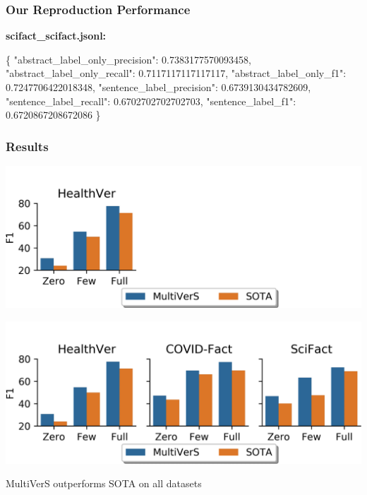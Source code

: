 \documentclass[13.5pt,aspecratio=169, xcolor=dvipsnames]{beamer}
\begin{document}
\begin{frame}[fragile]
    \onehalfspacing
        \frametitle{Our Reproduction Performance}
        \textbf{scifact\_scifact.jsonl:}
\vspace*{-1em} 
\begin{mybox}
\begin{semiverbatim}
\{
    "abstract_label_only_precision": 0.7383177570093458,
    "abstract_label_only_recall": 0.7117117117117117,
    "abstract_label_only_f1": 0.7247706422018348,
    "sentence_label_precision": 0.6739130434782609,
    "sentence_label_recall": 0.6702702702702703,
    "sentence_label_f1": 0.6720867208672086
\}\end{semiverbatim}
\end{mybox}
\end{frame}


\begin{frame}
    \onehalfspacing
        \frametitle{Results}

         {
            \vspace*{-2pt}
            \hspace{1pt}
            \includegraphics[width=\textwidth]{Result_0.png}

        }
         {
            \includegraphics[width=\textwidth]{Result_1.png}

            \begin{minipage}{0.6\textwidth}
                \begin{block}{}
                    \vspace*{0.5em}MultiVerS outperforms SOTA on all datasets
                \end{block}
            \end{minipage}
        }
       

    
\end{frame}
\end{document}
